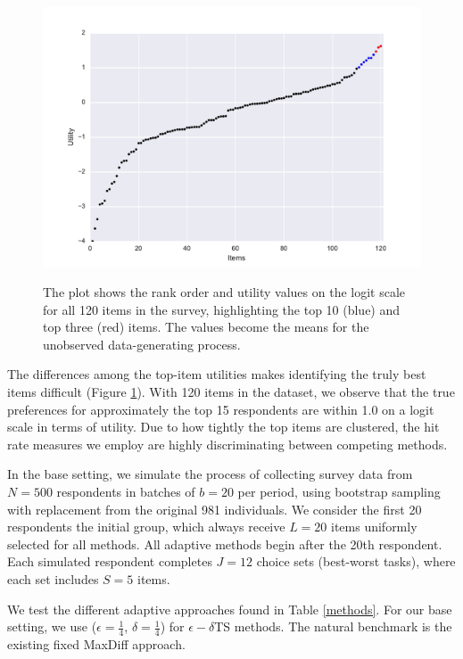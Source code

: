 \documentclass[a4paper,11pt]{article}
\newcommand{\numperset}{L}
\begin{document}
\begin{figure}[!ht]
\caption{The plot shows the rank order and utility values on the logit scale for all 120 items in the survey, highlighting the top 10 (blue) and top three (red) items. The values become the means for the unobserved data-generating process.}
\includegraphics[width=1\textwidth]{plots/utilscore.pdf}
\label{fig:util} 
\end{figure}

The differences among the top-item utilities makes identifying the truly best items difficult (Figure \ref{fig:util}). With 120 items in the dataset, we observe that the true preferences for approximately the top 15 respondents are within 1.0 on a logit scale in terms of utility. Due to how tightly the top items are clustered, the hit rate measures we employ are highly discriminating between competing methods.

In the base setting, we simulate the process of collecting survey data from $N=500$ respondents in batches of $b=20$ per period, using bootstrap sampling with replacement from the original 981 individuals. We consider the first 20 respondents the initial group, which always receive $\numperset=20$ items uniformly selected for all methods. All adaptive methods begin after the 20th respondent. Each simulated respondent completes $J=12$ choice sets (best-worst tasks), where each set includes $S=5$ items.

We test the different adaptive approaches found in Table \ref{methods}. For our base setting, we use ($\epsilon=\frac{1}{4}$, $\delta=\frac{1}{4}$) for $\epsilon-\delta$TS methods. The natural benchmark is the existing fixed MaxDiff approach.
\end{document}
